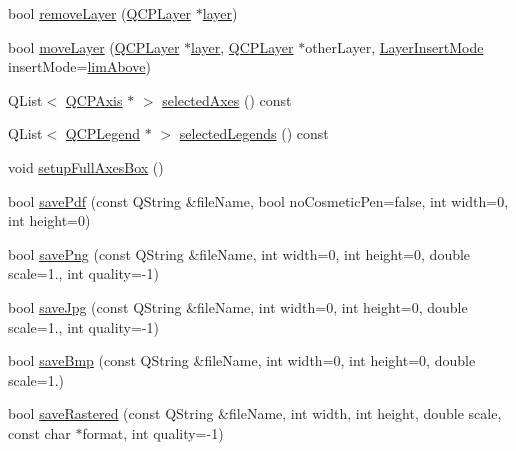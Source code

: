\begin{DoxyCompactItemize}
\item 
bool \hyperlink{classQCustomPlot_a40f75e342c5eaab6a86066a42a0e2a94}{remove\-Layer} (\hyperlink{classQCPLayer}{Q\-C\-P\-Layer} $\ast$\hyperlink{classQCustomPlot_aac492da01782820454e9136a8db28182}{layer})
\item 
bool \hyperlink{classQCustomPlot_ae896140beff19424e9e9e02d6e331104}{move\-Layer} (\hyperlink{classQCPLayer}{Q\-C\-P\-Layer} $\ast$\hyperlink{classQCustomPlot_aac492da01782820454e9136a8db28182}{layer}, \hyperlink{classQCPLayer}{Q\-C\-P\-Layer} $\ast$other\-Layer, \hyperlink{classQCustomPlot_a75a8afbe6ef333b1f3d47abb25b9add7}{Layer\-Insert\-Mode} insert\-Mode=\hyperlink{classQCustomPlot_a75a8afbe6ef333b1f3d47abb25b9add7a062b0b7825650b432a713c0df6742d41}{lim\-Above})
\item 
Q\-List$<$ \hyperlink{classQCPAxis}{Q\-C\-P\-Axis} $\ast$ $>$ \hyperlink{classQCustomPlot_aa6baf867e8beb96ed5bd471f83ece903}{selected\-Axes} () const 
\item 
Q\-List$<$ \hyperlink{classQCPLegend}{Q\-C\-P\-Legend} $\ast$ $>$ \hyperlink{classQCustomPlot_a1ea6297300c3e2770e65f95836411755}{selected\-Legends} () const 
\item 
void \hyperlink{classQCustomPlot_ad27d34bcc9e68b5482d128e2f1e38f55}{setup\-Full\-Axes\-Box} ()
\item 
bool \hyperlink{classQCustomPlot_a84e33ad7492180f20ff520e557ed102d}{save\-Pdf} (const Q\-String \&file\-Name, bool no\-Cosmetic\-Pen=false, int width=0, int height=0)
\item 
bool \hyperlink{classQCustomPlot_a7636261aff1f6d25c9da749ece3fc8b8}{save\-Png} (const Q\-String \&file\-Name, int width=0, int height=0, double scale=1., int quality=-\/1)
\item 
bool \hyperlink{classQCustomPlot_a490c722092d1771e8ce4a7a73dfd84ab}{save\-Jpg} (const Q\-String \&file\-Name, int width=0, int height=0, double scale=1., int quality=-\/1)
\item 
bool \hyperlink{classQCustomPlot_a6629d9e8e6da4bf18055ee0257fdce9a}{save\-Bmp} (const Q\-String \&file\-Name, int width=0, int height=0, double scale=1.)
\item 
bool \hyperlink{classQCustomPlot_ab528b84cf92baabe29b1d0ef2f77c93e}{save\-Rastered} (const Q\-String \&file\-Name, int width, int height, double scale, const char $\ast$format, int quality=-\/1)
\end{DoxyCompactItemize}
